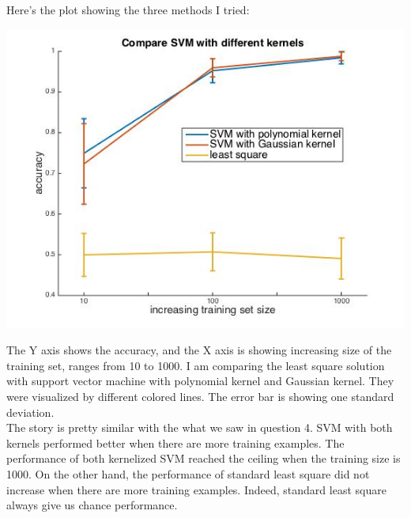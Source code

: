 \documentclass[paper=a4, fontsize=11pt]{scrartcl} %
\numberwithin{equation}{section} %
\numberwithin{figure}{section} %
\numberwithin{table}{section} %
\begin{document}
Here's the plot showing the three methods I tried: 
\begin{center}
\includegraphics[scale=.5]{hw8_5_compareSVM.jpg}
\end{center}

The Y axis shows the accuracy, and the X axis is showing increasing size of the training set, ranges from 10 to 1000. I am comparing the least square solution with support vector machine with polynomial kernel and Gaussian kernel. They were visualized by different colored lines. The error bar is showing one standard deviation. \\

The story is pretty similar with the what we saw in question 4. SVM with both kernels performed better when there are more training examples. The performance of both kernelized SVM reached the ceiling when the training size is 1000. On the other hand, the performance of standard least square did not increase when there are more training examples. Indeed, standard least square always give us chance performance. \\

\newpage
\end{document}
